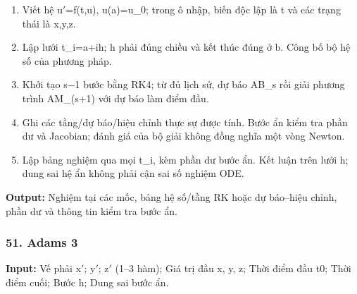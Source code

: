 \begin{enumerate}

\item Viết hệ u\ensuremath{\prime}=\allowbreak{}f(\allowbreak{}t,\allowbreak{}u),\allowbreak{} u(\allowbreak{}a)=\allowbreak{}u\_0;\allowbreak{} trong ô nhập,\allowbreak{} biến độc lập là t và các trạng thái là x,\allowbreak{}y,\allowbreak{}z.

\item Lập lưới t\_i=\allowbreak{}a+\allowbreak{}ih;\allowbreak{} h phải đúng chiều và kết thúc đúng ở b. Công bố bộ hệ số của phương pháp.

\item Khởi tạo s\ensuremath{-}1 bước bằng RK4;\allowbreak{} từ đủ lịch sử,\allowbreak{} dự báo AB\_s rồi giải phương trình AM\_(\allowbreak{}s+\allowbreak{}1) với dự báo làm điểm đầu.

\item Ghi các tầng/\allowbreak{}dự báo/\allowbreak{}hiệu chỉnh thực sự được tính. Bước ẩn kiểm tra phần dư và Jacobian;\allowbreak{} đánh giá của bộ giải không đồng nghĩa một vòng Newton.

\item Lập bảng nghiệm qua mọi t\_i,\allowbreak{} kèm phần dư bước ẩn. Kết luận trên lưới h;\allowbreak{} dung sai hệ ẩn không phải cận sai số nghiệm ODE.

\end{enumerate}

\textbf{Output:} Nghiệm tại các mốc,\allowbreak{} bảng hệ số/\allowbreak{}tầng RK hoặc dự báo–hiệu chỉnh,\allowbreak{} phần dư và thông tin kiểm tra bước ẩn.

\examplebreak\subsubsection*{51. Adams 3}

\textbf{Input:} Vế phải x\ensuremath{\prime};\allowbreak{} y\ensuremath{\prime};\allowbreak{} z\ensuremath{\prime} (\allowbreak{}1–3 hàm);\allowbreak{} Giá trị đầu x,\allowbreak{} y,\allowbreak{} z;\allowbreak{} Thời điểm đầu t0;\allowbreak{} Thời điểm cuối;\allowbreak{} Bước h;\allowbreak{} Dung sai bước ẩn.

